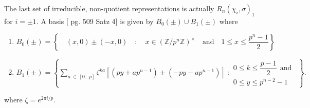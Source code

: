 \documentclass[12pt,reqno]{amsart}
\theoremstyle{remark}
\numberwithin{table}{section}
\newcommand{\Z}{\mathbb Z}
\begin{document}
The last set of irreducible, non-quotient representations is actually $R_{n}(\chi_i, \sigma)_1$ for $i = \pm1$. A basis [\cite{nobs1976irreduziblen} pg. 509 Satz 4] is given by $B_0(\pm) \cup B_1(\pm)$ where

\begin{enumerate}
\item  $ B_0(\pm) = \left\{ \quad (x,0)\pm(-x,0) \quad : \quad x \in (\Z/p^n\Z)^\times \quad  \textrm{and} \quad  1\leq x\leq \dfrac{p^n-1}2\right\}$ 
\item $B_1(\pm) = \left\{ 
\displaystyle{\sum_{a \: \in \: [0 \dots p]}} \zeta^{ka} [ (py +ap^{n-1}) \pm (-py -ap^{n-1}) ] \:  :  \begin{array}{l} 0 \leq k \leq \dfrac{p-1}2   \: \: \textrm{and}\: \ \\ 
 0 \leq y \leq p^{n-2}-1 \end{array}  \right\}.$
\end{enumerate}

where $\zeta = e^{2\pi i/ p}$.   




 

\end{document}
